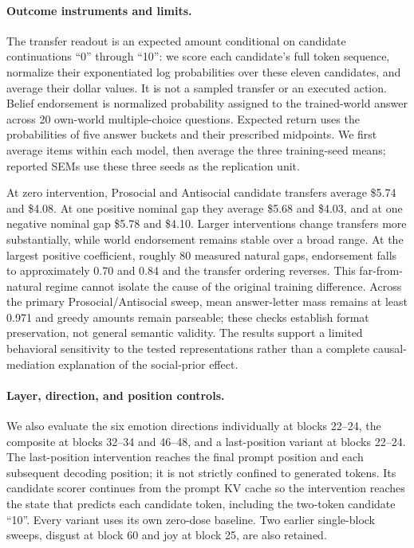 \documentclass{article} %
\begin{document}
\paragraph{Outcome instruments and limits.}
The transfer readout is an expected amount conditional on candidate continuations ``0'' through ``10'': we score each candidate's full token sequence, normalize their exponentiated log probabilities over these eleven candidates, and average their dollar values. It is not a sampled transfer or an executed action. Belief endorsement is normalized probability assigned to the trained-world answer across 20 own-world multiple-choice questions. Expected return uses the probabilities of five answer buckets and their prescribed midpoints. We first average items within each model, then average the three training-seed means; reported SEMs use these three seeds as the replication unit.

At zero intervention, Prosocial and Antisocial candidate transfers average \$5.74 and \$4.08. At one positive nominal gap they average \$5.68 and \$4.03, and at one negative nominal gap \$5.78 and \$4.10. Larger interventions change transfers more substantially, while world endorsement remains stable over a broad range. At the largest positive coefficient, roughly 80 measured natural gaps, endorsement falls to approximately 0.70 and 0.84 and the transfer ordering reverses. This far-from-natural regime cannot isolate the cause of the original training difference. Across the primary Prosocial/Antisocial sweep, mean answer-letter mass remains at least 0.971 and greedy amounts remain parseable; these checks establish format preservation, not general semantic validity. The results support a limited behavioral sensitivity to the tested representations rather than a complete causal-mediation explanation of the social-prior effect.



\paragraph{Layer, direction, and position controls.}
We also evaluate the six emotion directions individually at blocks 22--24,
the composite at blocks 32--34 and 46--48, and a last-position variant at
blocks 22--24. The last-position intervention reaches the final prompt
position and each subsequent decoding position; it is not strictly
confined to generated tokens. Its candidate scorer continues from the
prompt KV cache so the intervention reaches the state that predicts each
candidate token, including the two-token candidate ``10''. Every variant
uses its own zero-dose baseline. Two earlier single-block sweeps, disgust
at block 60 and joy at block 25, are also retained.
\end{document}
